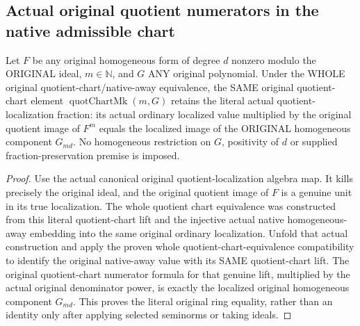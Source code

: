 \subsection{Actual original quotient numerators in the native admissible chart}

\begin{lemma}
\label{projective:actual-admissible-native-quotient-fractions}
\leanok
{}
Let $F$ be any original homogeneous form of degree $d$ nonzero modulo
the ORIGINAL ideal, $m\in\mathbb N$, and $G$ ANY original polynomial.
Under the WHOLE original quotient-chart/native-away equivalence, the
SAME original quotient-chart element $\operatorname{quotChartMk}(m,G)$
retains the literal actual quotient-localization fraction: its actual
ordinary localized value multiplied by the original quotient image of
$F^m$ equals the localized image of the ORIGINAL homogeneous component
$G_{md}$. No homogeneous restriction on $G$, positivity of $d$ or
supplied fraction-preservation premise is imposed.
\end{lemma}
\begin{proof}
Use the actual canonical original quotient-localization algebra map.
It kills precisely the original ideal, and the original quotient image
of $F$ is a genuine unit in its true localization. The whole quotient
chart equivalence was constructed from this literal quotient-chart lift
and the injective actual native homogeneous-away embedding into the
same original ordinary localization. Unfold that actual construction
and apply the proven whole quotient-chart-equivalence compatibility to
identify the original native-away value with its SAME quotient-chart
lift. The original quotient-chart numerator formula for that genuine
lift, multiplied by the actual original denominator power, is exactly
the localized original homogeneous component $G_{md}$. This proves the
literal original ring equality, rather than an identity only after
applying selected seminorms or taking ideals.
\end{proof}

